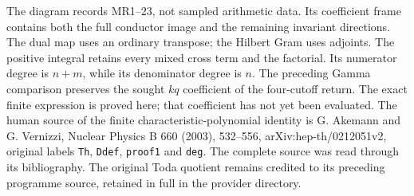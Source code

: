 \documentclass[11pt]{article}
\begin{document}
The diagram records MR1--23, not sampled arithmetic data. Its coefficient
frame contains both the full conductor image and the remaining invariant
directions. The dual map uses an ordinary transpose; the Hilbert Gram uses
adjoints. The positive integral retains every mixed cross term and the
factorial. Its numerator degree is $n+m$, while its denominator degree is
$n$. The preceding Gamma comparison preserves the sought $kq$ coefficient
of the four-cutoff return. The exact finite expression is proved here;
that coefficient has not yet been evaluated.
The human source of the finite characteristic-polynomial identity is
G. Akemann and G. Vernizzi, Nuclear Physics B 660 (2003), 532--556,
arXiv:hep-th/0212051v2, original labels \texttt{Th}, \texttt{Ddef},
\texttt{proof1} and \texttt{deg}. The complete source was read through
its bibliography. The original Toda quotient remains credited to its
preceding programme source, retained in full in the provider directory.
\endgroup
\end{document}
